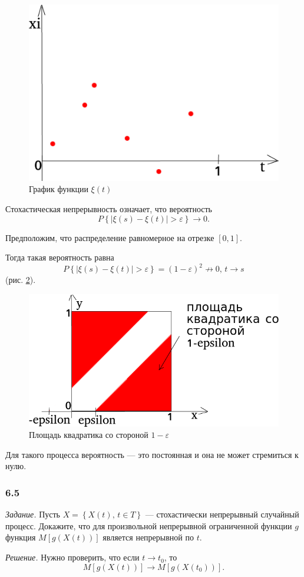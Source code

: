 \begin{figure}[h!]
  \centering
  \includegraphics[width=.4\textwidth]{./pictures/6_4.png}
  \caption{График функции $ \xi \left( t \right) $}
  \label{fig:64}
\end{figure}

Стохастическая непрерывность означает, что вероятность
$$P \left\{ \left| \xi \left( s \right) - \xi \left( t \right) \right| > \varepsilon \right\} \to
  0.$$

Предположим, что распределение равномерное на отрезке $ \left[ 0, 1 \right] $.

Тогда такая вероятность равна
$$P \left\{ \left| \xi \left( s \right) - \xi \left( t \right) \right| > \varepsilon \right\} =
  \left( 1 - \varepsilon \right)^2 \not \to
  0, \,
  t \to s$$
(рис. \ref{fig:641}).

\begin{figure}[h!]
  \centering
  \includegraphics[width=.4\textwidth]{./pictures/6_4_1.png}
  \caption{Площадь квадратика со стороной $1 - \varepsilon$}
  \label{fig:641}
\end{figure}

Для такого процесса вероятность --- это постоянная и она не может стремиться к нулю.

\subsubsection*{6.5}

\textit{Задание.}
Пусть $X = \left\{ X \left( t \right), \, t \in T \right\} $ ---
стохастически непрерывный случайный процесс.
Докажите, что для произвольной непрерывной ограниченной функции $g$ функция
$M \left[ g \left( X \left( t \right) \right) \right] $ является непрерывной по $t$.

\textit{Решение.}
Нужно проверить, что если $t \to t_0$, то
$$M \left[ g \left( X \left( t \right) \right) \right] \to
  M \left[ g \left( X \left( t_0 \right) \right) \right].$$

